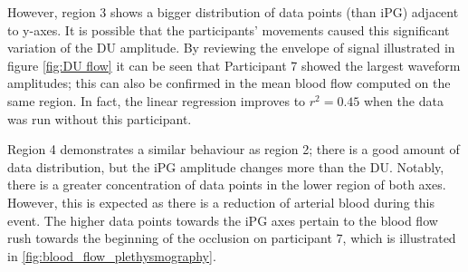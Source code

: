 
However, region 3 shows a bigger distribution of data points (than iPG) adjacent to y-axes. It is possible that the participants' movements caused this significant variation of the DU amplitude. By reviewing the envelope of signal illustrated in figure \ref{fig:DU flow} it can be seen that Participant 7 showed the largest waveform amplitudes; this can also be confirmed in the mean blood flow computed on the same region. In fact, the linear regression improves to $r^2 = 0.45$ when the data was run without this participant. 

Region 4 demonstrates a similar behaviour as region 2; there is a good amount of data distribution, but the iPG amplitude changes more than the DU. Notably, there is a greater concentration of data points in the lower region of both axes. However, this is expected as there is a reduction of arterial blood during this event. The higher data points towards the iPG axes pertain to the blood flow rush towards the beginning of the occlusion on participant 7, which is illustrated in \ref{fig:blood_flow_plethysmography}.

